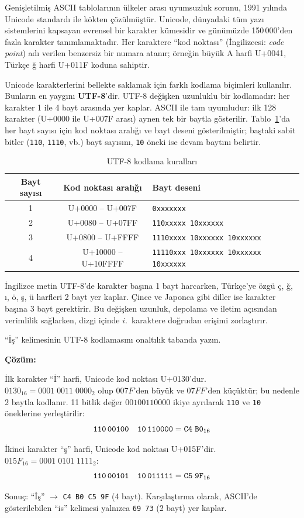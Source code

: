 Genişletilmiş ASCII tablolarının ülkeler arası uyumsuzluk sorunu, 1991 yılında Unicode standardı ile kökten çözülmüştür. Unicode, dünyadaki tüm yazı sistemlerini kapsayan evrensel bir karakter kümesidir ve günümüzde 150\,000'den fazla karakter tanımlamaktadır. Her karaktere ``kod noktası'' (İngilizcesi: \textit{code point}) adı verilen benzersiz bir numara atanır; örneğin büyük A harfi U+0041, Türkçe ğ harfi U+011F koduna sahiptir.

Unicode karakterlerini bellekte saklamak için farklı kodlama biçimleri kullanılır. Bunların en yaygını \textbf{UTF-8}'dir. UTF-8 değişken uzunluklu bir kodlamadır: her karakter 1 ile 4 bayt arasında yer kaplar. ASCII ile tam uyumludur: ilk 128 karakter (U+0000 ile U+007F arası) aynen tek bir baytla gösterilir. Tablo~\ref{tab:utf8-kodlama}'da her bayt sayısı için kod noktası aralığı ve bayt deseni gösterilmiştir; baştaki sabit bitler (\texttt{110}, \texttt{1110}, vb.) bayt sayısını, \texttt{10} öneki ise devam baytını belirtir.

\begin{table}[H]
\centering
\caption{UTF-8 kodlama kuralları}
\label{tab:utf8-kodlama}
\begin{tabular}{ccl}
\toprule
\textbf{Bayt sayısı} & \textbf{Kod noktası aralığı} & \textbf{Bayt deseni} \\
\midrule
1 & U+0000 -- U+007F   & \texttt{0xxxxxxx} \\
2 & U+0080 -- U+07FF   & \texttt{110xxxxx 10xxxxxx} \\
3 & U+0800 -- U+FFFF   & \texttt{1110xxxx 10xxxxxx 10xxxxxx} \\
4 & U+10000 -- U+10FFFF & \texttt{11110xxx 10xxxxxx 10xxxxxx 10xxxxxx} \\
\bottomrule
\end{tabular}
\end{table}

İngilizce metin UTF-8'de karakter başına 1 bayt harcarken, Türkçe'ye özgü ç, ğ, ı, ö, ş, ü harfleri 2 bayt yer kaplar. Çince ve Japonca gibi diller ise karakter başına 3 bayt gerektirir. Bu değişken uzunluk, depolama ve iletim açısından verimlilik sağlarken, dizgi içinde $i$.~karaktere doğrudan erişimi zorlaştırır.

\begin{ornek}[A.23]
``İş'' kelimesinin UTF-8 kodlamasını onaltılık tabanda yazın.

\textbf{Çözüm:}

İlk karakter ``İ'' harfi, Unicode kod noktası U+0130'dur. $0130_{16} = 0001\;0011\;0000_2$ olup $007F$'den büyük ve $07FF$'den küçüktür; bu nedenle 2 baytla kodlanır. 11 bitlik değer $00100110000$ ikiye ayrılarak \texttt{110} ve \texttt{10} öneklerine yerleştirilir:
\[
\texttt{110\,00100\quad 10\,110000} = \texttt{C4\;B0}_{16}
\]

İkinci karakter ``ş'' harfi, Unicode kod noktası U+015F'dir. $015F_{16} = 0001\;0101\;1111_2$:
\[
\texttt{110\,00101\quad 10\,011111} = \texttt{C5\;9F}_{16}
\]

Sonuç: ``İş'' $\rightarrow$ \texttt{C4 B0 C5 9F} (4 bayt). Karşılaştırma olarak, ASCII'de gösterilebilen ``is'' kelimesi yalnızca \texttt{69 73} (2 bayt) yer kaplar.
\end{ornek}


